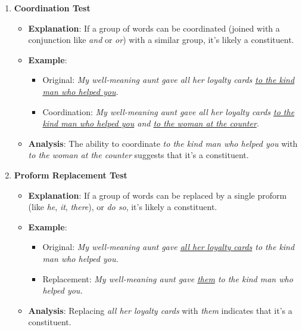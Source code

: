 \begin{enumerate}[noitemsep]
    \item \textbf{Coordination Test}
    \begin{itemize}[noitemsep]
        \item \textbf{Explanation}: If a group of words can be coordinated (joined with a conjunction like \textit{and} or \textit{or}) with a similar group, it's likely a constituent.
        \item \textbf{Example}:
        \begin{itemize}[noitemsep]
            \item Original: \textit{My well-meaning aunt gave all her loyalty cards \underline{to the kind man who helped you}.}
            \item Coordination: \textit{My well-meaning aunt gave all her loyalty cards \underline{to the kind man who helped you} and \underline{to the woman at the counter}.}
        \end{itemize}
        \item \textbf{Analysis}: The ability to coordinate \textit{to the kind man who helped you} with \textit{to the woman at the counter} suggests that it's a constituent.
    \end{itemize}
    
    \item \textbf{Proform Replacement Test}
    \begin{itemize}[noitemsep]
        \item \textbf{Explanation}: If a group of words can be replaced by a single proform (like \textit{he}, \textit{it}, \textit{there}), or \textit{do so}, it's likely a constituent.
        \item \textbf{Example}:
        \begin{itemize}[noitemsep]
            \item Original: \textit{My well-meaning aunt gave \underline{all her loyalty cards} to the kind man who helped you.}
            \item Replacement: \textit{My well-meaning aunt gave \underline{them} to the kind man who helped you.}
        \end{itemize}
        \item \textbf{Analysis}: Replacing \textit{all her loyalty cards} with \textit{them} indicates that it's a constituent.
    \end{itemize}
    

\end{enumerate}
